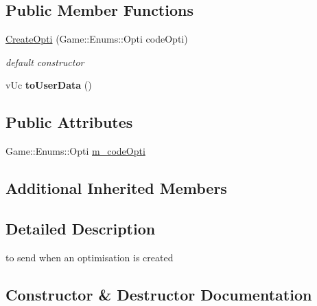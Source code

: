 \subsection*{Public Member Functions}
\begin{DoxyCompactItemize}
\item 
\hyperlink{class_network_1_1_messages_1_1_create_opti_ac4a1fdb545880690446312261e3c6e6a}{Create\+Opti} (Game\+::\+Enums\+::\+Opti code\+Opti)
\begin{DoxyCompactList}\small\item\em default constructor \end{DoxyCompactList}\item 
\mbox{\label{class_network_1_1_messages_1_1_create_opti_a5dda7b913784dbe91c1ae2557999850b}} 
v\+Uc {\bfseries to\+User\+Data} ()
\end{DoxyCompactItemize}
\subsection*{Public Attributes}
\begin{DoxyCompactItemize}
\item 
Game\+::\+Enums\+::\+Opti \hyperlink{class_network_1_1_messages_1_1_create_opti_af20bfa22b5eaa162f9b9e129637b4768}{m\+\_\+code\+Opti}
\end{DoxyCompactItemize}
\subsection*{Additional Inherited Members}


\subsection{Detailed Description}
to send when an optimisation is created 

\subsection{Constructor \& Destructor Documentation}
\mbox{\label{class_network_1_1_messages_1_1_create_opti_ac4a1fdb545880690446312261e3c6e6a}} 
